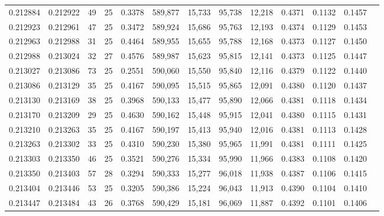 \begin{tabular}{rrrrrrrrrrrrr}
0.212884 & 0.212922 &  49 &  25 &                                     0.3378 & 589,877 &  15,733 &  95,738 &  12,218 & 0.4371 & 0.1132 & 0.1457 \\
0.212923 & 0.212961 &  47 &  25 &                                     0.3472 & 589,924 &  15,686 &  95,763 &  12,193 & 0.4374 & 0.1129 & 0.1453 \\
0.212963 & 0.212988 &  31 &  25 &                                     0.4464 & 589,955 &  15,655 &  95,788 &  12,168 & 0.4373 & 0.1127 & 0.1450 \\
0.212988 & 0.213024 &  32 &  27 &                                     0.4576 & 589,987 &  15,623 &  95,815 &  12,141 & 0.4373 & 0.1125 & 0.1447 \\
0.213027 & 0.213086 &  73 &  25 &                                     0.2551 & 590,060 &  15,550 &  95,840 &  12,116 & 0.4379 & 0.1122 & 0.1440 \\
0.213086 & 0.213129 &  35 &  25 &                                     0.4167 & 590,095 &  15,515 &  95,865 &  12,091 & 0.4380 & 0.1120 & 0.1437 \\
0.213130 & 0.213169 &  38 &  25 &                                     0.3968 & 590,133 &  15,477 &  95,890 &  12,066 & 0.4381 & 0.1118 & 0.1434 \\
0.213170 & 0.213209 &  29 &  25 &                                     0.4630 & 590,162 &  15,448 &  95,915 &  12,041 & 0.4380 & 0.1115 & 0.1431 \\
0.213210 & 0.213263 &  35 &  25 &                                     0.4167 & 590,197 &  15,413 &  95,940 &  12,016 & 0.4381 & 0.1113 & 0.1428 \\
0.213263 & 0.213302 &  33 &  25 &                                     0.4310 & 590,230 &  15,380 &  95,965 &  11,991 & 0.4381 & 0.1111 & 0.1425 \\
0.213303 & 0.213350 &  46 &  25 &                                     0.3521 & 590,276 &  15,334 &  95,990 &  11,966 & 0.4383 & 0.1108 & 0.1420 \\
0.213350 & 0.213403 &  57 &  28 &                                     0.3294 & 590,333 &  15,277 &  96,018 &  11,938 & 0.4387 & 0.1106 & 0.1415 \\
0.213404 & 0.213446 &  53 &  25 &                                     0.3205 & 590,386 &  15,224 &  96,043 &  11,913 & 0.4390 & 0.1104 & 0.1410 \\
0.213447 & 0.213484 &  43 &  26 &                                     0.3768 & 590,429 &  15,181 &  96,069 &  11,887 & 0.4392 & 0.1101 & 0.1406 \\

\end{tabular}
